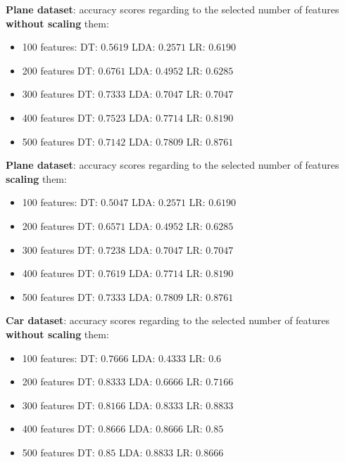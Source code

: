 \documentclass{article} %
\begin{document}
\textbf{Plane dataset}: accuracy scores regarding to the selected number of features \textbf{without scaling} them:
\begin{multicols}{2}
\begin{itemize}
    \item 100 features:
    \subitem DT: $0.5619$
    \subitem LDA: $0.2571$
    \subitem LR: $0.6190$
    \item 200 features
    \subitem DT: $0.6761$
    \subitem LDA: $0.4952$
    \subitem LR: $0.6285$
    \item 300 features
    \subitem DT: $0.7333$
    \subitem LDA: $0.7047$
    \subitem LR: $0.7047$
    \item 400 features
    \subitem DT: $0.7523$
    \subitem LDA: $0.7714$
    \subitem LR: $0.8190$
    \item 500 features
    \subitem DT: $0.7142$
    \subitem LDA: $0.7809$
    \subitem LR: $0.8761$
\end{itemize}
\end{multicols}

\textbf{Plane dataset}: accuracy scores regarding to the selected number of features \textbf{scaling} them:
\begin{multicols}{2}
\begin{itemize}
    \item 100 features:
    \subitem DT: $0.5047$
    \subitem LDA: $0.2571$
    \subitem LR: $0.6190$
    \item 200 features
    \subitem DT: $0.6571$
    \subitem LDA: $0.4952$
    \subitem LR: $0.6285$
    \item 300 features
    \subitem DT: $0.7238$
    \subitem LDA: $0.7047$
    \subitem LR: $0.7047$
    \item 400 features
    \subitem DT: $0.7619$
    \subitem LDA: $0.7714$
    \subitem LR: $0.8190$
    \item 500 features
    \subitem DT: $0.7333$
    \subitem LDA: $0.7809$
    \subitem LR: $0.8761$
\end{itemize}
\end{multicols}

\textbf{Car dataset}: accuracy scores regarding to the selected number of features \textbf{without scaling} them:
\begin{multicols}{2}
\begin{itemize}
    \item 100 features:
    \subitem DT: $0.7666$
    \subitem LDA: $0.4333$
    \subitem LR: $0.6$
    \item 200 features
    \subitem DT: $0.8333$
    \subitem LDA: $0.6666$
    \subitem LR: $0.7166$
    \item 300 features
    \subitem DT: $0.8166$
    \subitem LDA: $0.8333$
    \subitem LR: $0.8833$
    \item 400 features
    \subitem DT: $0.8666$
    \subitem LDA: $0.8666$
    \subitem LR: $0.85$
    \item 500 features
    \subitem DT: $0.85$
    \subitem LDA: $0.8833$
    \subitem LR: $0.8666$
\end{itemize}
\end{multicols}
\end{document}
